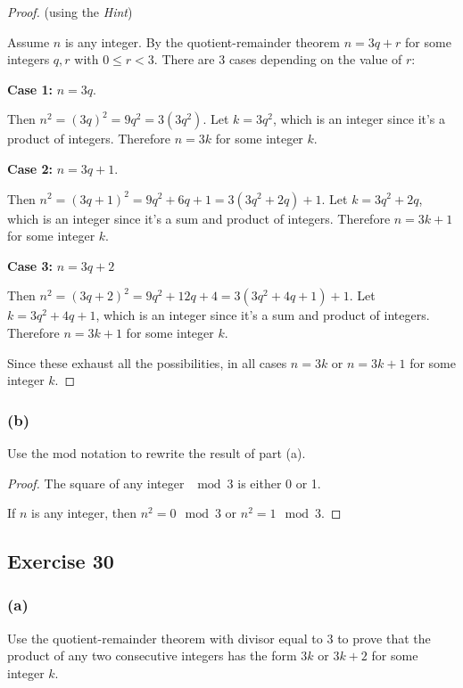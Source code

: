 \documentclass[14pt]{extarticle}
\begin{document}
\begin{proof}
    (using the {\it Hint})

    Assume $n$ is any integer. By the quotient-remainder theorem $n = 3q+r$ for some integers $q,r$ with $0 \leq r < 3$. There are 3 cases depending on the value of $r$:

    {\bf Case 1:} $n = 3q$.

    Then $n^2 = (3q)^2 = 9q^2 = 3(3q^2)$. Let $k = 3q^2$, which is an integer since it's a product of integers. Therefore $n = 3k$ for some integer $k$.

        {\bf Case 2:} $n = 3q + 1$.

    Then $n^2 = (3q+1)^2 = 9q^2 + 6q + 1 = 3(3q^2 + 2q) + 1$. Let $k = 3q^2 + 2q$, which is an integer since it's a sum and product of integers. Therefore $n = 3k + 1$ for some integer $k$.

        {\bf Case 3:} $n = 3q + 2$

    Then $n^2 = (3q+2)^2 = 9q^2 + 12q + 4 = 3(3q^2 + 4q + 1) + 1$. Let $k = 3q^2 + 4q+1$, which is an integer since it's a sum and product of integers. Therefore $n = 3k + 1$ for some integer $k$.

    Since these exhaust all the possibilities, in all cases $n = 3k$ or $n = 3k+1$ for some integer $k$.
\end{proof}

\subsubsection{(b)}
Use the mod notation to rewrite the result of part (a).

\begin{proof}
    The square of any integer $\mod 3$ is either 0 or 1.

    If $n$ is any integer, then $n^2 = 0 \mod 3$ or $n^2 = 1 \mod 3$.
\end{proof}

\subsection{Exercise 30}

\subsubsection{(a)}
Use the quotient-remainder theorem with divisor equal to 3 to prove that the product of any two consecutive integers has the form $3k$ or $3k + 2$ for some integer $k$.
\end{document}
